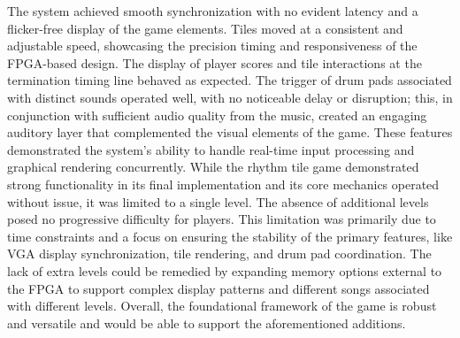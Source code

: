 \documentclass{subfile}
\begin{document}
The system achieved smooth synchronization with no evident latency and a flicker-free display of the game elements. Tiles moved at a consistent and adjustable speed, showcasing the precision timing and responsiveness of the FPGA-based design. The display of player scores and tile interactions at the termination timing line behaved as expected. The trigger of drum pads associated with distinct sounds operated well, with no noticeable delay or disruption; this, in conjunction with sufficient audio quality from the music, created an engaging auditory layer that complemented the visual elements of the game. These features demonstrated the system's ability to handle real-time input processing and graphical rendering concurrently. 
While the rhythm tile game demonstrated strong functionality in its final implementation and its core mechanics operated without issue, it was limited to a single level. The absence of additional levels posed no progressive difficulty for players. This limitation was primarily due to time constraints and a focus on ensuring the stability of the primary features, like VGA display synchronization, tile rendering, and drum pad coordination. The lack of extra levels could be remedied by expanding memory options external to the FPGA to support complex display patterns and different songs associated with different levels. 
Overall, the foundational framework of the game is robust and versatile and would be able to support the aforementioned additions. 
\end{document}
